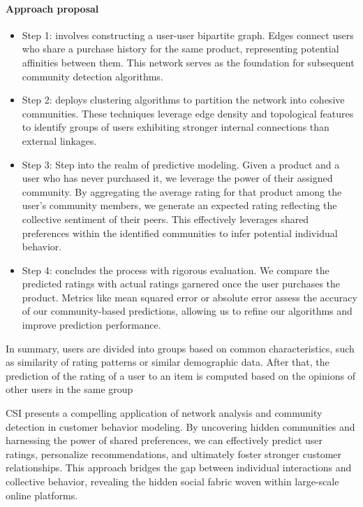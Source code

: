 \paragraph{Approach proposal}
\begin{itemize}
    \item Step 1: involves constructing a user-user bipartite graph. Edges connect users who share a purchase history for the same product, representing potential affinities between them. This network serves as the foundation for subsequent community detection algorithms.
    \item Step 2: deploys clustering algorithms to partition the network into cohesive communities. These techniques leverage edge density and topological features to identify groups of users exhibiting stronger internal connections than external linkages.
    \item Step 3: Step into the realm of predictive modeling. Given a product and a user who has never purchased it, we leverage the power of their assigned community. By aggregating the average rating for that product among the user's community members, we generate an expected rating reflecting the collective sentiment of their peers. This effectively leverages shared preferences within the identified communities to infer potential individual behavior.
    \item Step 4: concludes the process with rigorous evaluation. We compare the predicted ratings with actual ratings garnered once the user purchases the product. Metrics like mean squared error or absolute error assess the accuracy of our community-based predictions, allowing us to refine our algorithms and improve prediction performance.
\end{itemize}
In summary, users are divided into groups based on common characteristics, such as similarity of rating patterns or similar demographic data. 
After that, the prediction of the rating of a user to an item is computed based on the opinions of other users in the same group

CSI presents a compelling application of network analysis and community detection in customer behavior modeling. By uncovering hidden communities and harnessing the power of shared preferences, we can effectively predict user ratings, personalize recommendations, and ultimately foster stronger customer relationships. This approach bridges the gap between individual interactions and collective behavior, revealing the hidden social fabric woven within large-scale online platforms.
